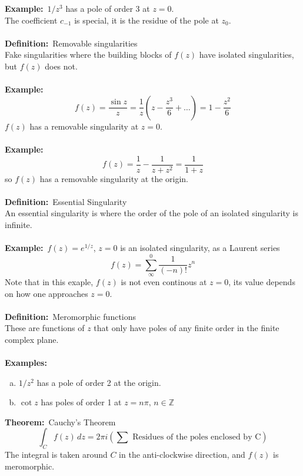 \documentclass{article}
\newcommand{\definition}{\textbf{Definition:}}
\newcommand{\example}{\textbf{Example:}}
\newcommand{\examples}{\textbf{Examples:}}
\newcommand{\theorem}{\textbf{Theorem:}}
\begin{document}
\noindent \example\ $1/z^3$ has a pole of order 3 at $z=0$.
\\
The coefficient $c_{-1}$ is special, it is the residue of the pole at 
$z_0$.
\\
\\
\definition\ Removable singularities
\\
Fake singularities where the building blocks of $f(z)$ have isolated
singularities, but $f(z)$ does not.
\\
\\
\example\
\[ f(z) = \frac{\sin z}{z} = \frac{1}{z} ( z - \frac{z^3}{6} + \dots) 
= 1 - \frac{z^2}{6} \]
$f(z)$ has a removable singularity at $z=0$.
\\
\\
\example\
\[ f(z) = \frac{1}{z} - \frac{1}{z + z^2} = \frac{1}{1+z} \]
so $f(z)$ has a removable singularity at the origin.
\\
\\
\definition\ Essential Singularity \\
An essential singularity is where the order of the pole of an isolated
singularity is infinite.
\\
\\
\example\ $f(z) = e^{1/z}$, $z=0$ is an isolated singularity, as a Laurent
series
\[ f(z) = \sum_{\infty}^{0} \frac{1}{(-n)!} z^n \]
Note that in this exaple, $f(z)$ is not even continous at $z=0$, its value
depends on how one approaches $z=0$.
\\
\\
\definition\ Meromorphic functions
\\
These are functions of $z$ that only have poles of any finite order
in the finite complex plane. \\
\\
\examples\
\begin{enumerate}[(a)]
\item $1/z^2$ has a pole of order 2 at the origin.
\item $\cot z$ has poles of order 1 at $z = n\pi, \, n \in \mathbb{Z}$
\end{enumerate}
\noindent \theorem\ Cauchy's Theorem
\[ \int_C f(z) \, dz = 2 \pi i \left( \sum \mbox{ Residues of the poles
enclosed by C} \right) \]
The integral is taken around $C$ in the anti-clockwise direction, and
$f(z)$ is meromorphic.
\\
\end{document}
